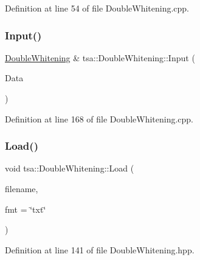Definition at line 54 of file Double\+Whitening.\+cpp.

\mbox{\label{classtsa_1_1_double_whitening_a84c0175991fd9103e3783fbb8e3e1acb}} 
\subsubsection{\texorpdfstring{Input()}{Input()}}
{\footnotesize\ttfamily \hyperlink{classtsa_1_1_double_whitening}{Double\+Whitening} \& tsa\+::\+Double\+Whitening\+::\+Input (\begin{DoxyParamCaption}\item[{\hyperlink{namespacetsa_ac599574bcc094eda25613724b8f3ca9e}{Seq\+View\+Double} \&}]{Data }\end{DoxyParamCaption})}



Definition at line 168 of file Double\+Whitening.\+cpp.

\mbox{\label{classtsa_1_1_double_whitening_a81b4fbbc957ce758982cf2b57eb46409}} 
\subsubsection{\texorpdfstring{Load()}{Load()}}
{\footnotesize\ttfamily void tsa\+::\+Double\+Whitening\+::\+Load (\begin{DoxyParamCaption}\item[{const char $\ast$}]{filename,  }\item[{const char $\ast$}]{fmt = {\ttfamily \char`\"{}txt\char`\"{}} }\end{DoxyParamCaption})\hspace{0.3cm}{\ttfamily [inline]}}



Definition at line 141 of file Double\+Whitening.\+hpp.

\mbox{\label{classtsa_1_1_double_whitening_a1e445020972445857c2aa175f3460f7e}} 
